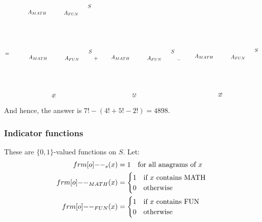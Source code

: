 \documentclass[12pt]{article}
\begin{document}
\[\begin{tikzpicture}[x=0.75pt,y=0.75pt,yscale=-1,xscale=1]
    \draw (218.67,15.12) node [anchor=north west][inner sep=0.75pt]    {$S$};
    \draw (68.97,29.52) node [anchor=north west][inner sep=0.75pt]    {$A_{MATH}$};
    \draw (158.97,31.75) node [anchor=north west][inner sep=0.75pt]    {$A_{FUN}$};
    \draw (12,137.4) node [anchor=north west][inner sep=0.75pt]    {$=$};
    \draw (220.67,128.4) node [anchor=north west][inner sep=0.75pt]    {$S$};
    \draw (70.97,142.81) node [anchor=north west][inner sep=0.75pt]    {$A_{MATH}$};
    \draw (160.97,145.03) node [anchor=north west][inner sep=0.75pt]    {$A_{FUN}$};
    \draw (426.67,128.4) node [anchor=north west][inner sep=0.75pt]    {$S$};
    \draw (276.97,142.81) node [anchor=north west][inner sep=0.75pt]    {$A_{MATH}$};
    \draw (366.97,145.03) node [anchor=north west][inner sep=0.75pt]    {$A_{FUN}$};
    \draw (635.67,125.4) node [anchor=north west][inner sep=0.75pt]    {$S$};
    \draw (485.97,139.81) node [anchor=north west][inner sep=0.75pt]    {$A_{MATH}$};
    \draw (575.97,142.03) node [anchor=north west][inner sep=0.75pt]    {$A_{FUN}$};
    \draw (234,146.4) node [anchor=north west][inner sep=0.75pt]    {$+$};
    \draw (441,149.4) node [anchor=north west][inner sep=0.75pt]    {$-$};
    \draw (128,239.4) node [anchor=north west][inner sep=0.75pt]    {$4!$};
    \draw (330,238.4) node [anchor=north west][inner sep=0.75pt]    {$5!$};
    \draw (545,236.4) node [anchor=north west][inner sep=0.75pt]    {$2!$};
    
    
    \end{tikzpicture}
    \]
And hence, the answer is $7!-(4!+5!-2!)=4898$.

\subsubsection{Indicator functions}
These are $\{0,1\}$-valued functions on $S$.
\eg Let: \begin{align*}
    \1_s(x) &=1 \text{\quad for all anagrams of $x$}\\
    \1_{MATH}(x) &= \begin{cases}
        1 & \text{if $x$ contains MATH}\\
        0 & \text{otherwise}
    \end{cases}\\
    \1_{FUN}(x) &= \begin{cases}
        1 & \text{if $x$ contains FUN}\\
        0 & \text{otherwise}
    \end{cases}\\
\end{align*}
\end{document}
